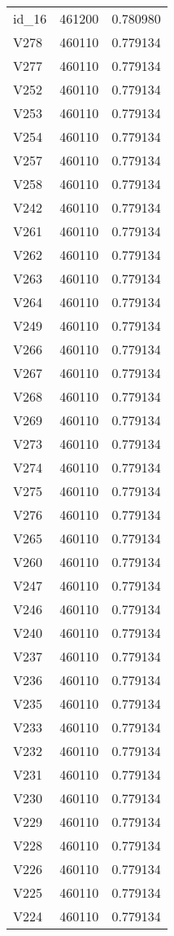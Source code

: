 \begin{tabular}{lrr}
id_16 & 461200 & 0.780980 \\
V278 & 460110 & 0.779134 \\
V277 & 460110 & 0.779134 \\
V252 & 460110 & 0.779134 \\
V253 & 460110 & 0.779134 \\
V254 & 460110 & 0.779134 \\
V257 & 460110 & 0.779134 \\
V258 & 460110 & 0.779134 \\
V242 & 460110 & 0.779134 \\
V261 & 460110 & 0.779134 \\
V262 & 460110 & 0.779134 \\
V263 & 460110 & 0.779134 \\
V264 & 460110 & 0.779134 \\
V249 & 460110 & 0.779134 \\
V266 & 460110 & 0.779134 \\
V267 & 460110 & 0.779134 \\
V268 & 460110 & 0.779134 \\
V269 & 460110 & 0.779134 \\
V273 & 460110 & 0.779134 \\
V274 & 460110 & 0.779134 \\
V275 & 460110 & 0.779134 \\
V276 & 460110 & 0.779134 \\
V265 & 460110 & 0.779134 \\
V260 & 460110 & 0.779134 \\
V247 & 460110 & 0.779134 \\
V246 & 460110 & 0.779134 \\
V240 & 460110 & 0.779134 \\
V237 & 460110 & 0.779134 \\
V236 & 460110 & 0.779134 \\
V235 & 460110 & 0.779134 \\
V233 & 460110 & 0.779134 \\
V232 & 460110 & 0.779134 \\
V231 & 460110 & 0.779134 \\
V230 & 460110 & 0.779134 \\
V229 & 460110 & 0.779134 \\
V228 & 460110 & 0.779134 \\
V226 & 460110 & 0.779134 \\
V225 & 460110 & 0.779134 \\
V224 & 460110 & 0.779134 \\

\end{tabular}
